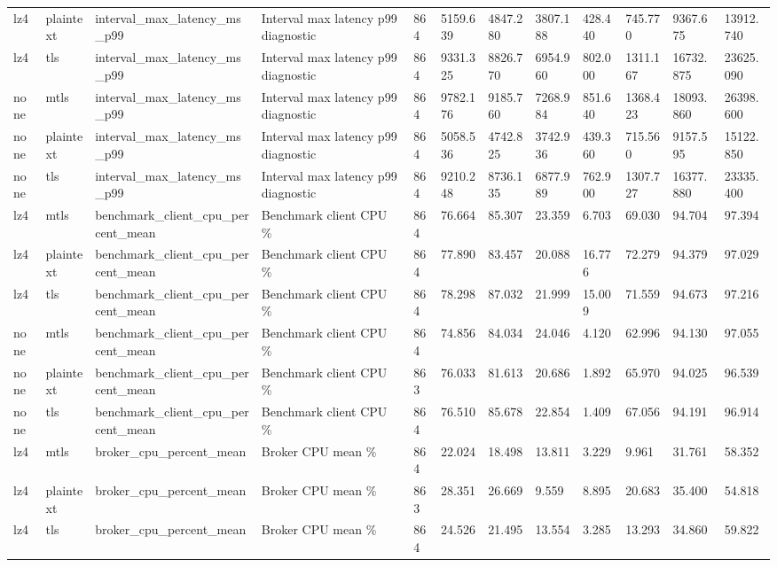 \begin{longtable}{llllllllllll}
lz4 & plaintext & interval\_max\_latency\_ms\_p99 & Interval max latency p99 diagnostic & 864 & 5159.639 & 4847.280 & 3807.188 & 428.440 & 745.770 & 9367.675 & 13912.740 \\
lz4 & tls & interval\_max\_latency\_ms\_p99 & Interval max latency p99 diagnostic & 864 & 9331.325 & 8826.770 & 6954.960 & 802.000 & 1311.167 & 16732.875 & 23625.090 \\
none & mtls & interval\_max\_latency\_ms\_p99 & Interval max latency p99 diagnostic & 864 & 9782.176 & 9185.760 & 7268.984 & 851.640 & 1368.423 & 18093.860 & 26398.600 \\
none & plaintext & interval\_max\_latency\_ms\_p99 & Interval max latency p99 diagnostic & 864 & 5058.536 & 4742.825 & 3742.936 & 439.360 & 715.560 & 9157.595 & 15122.850 \\
none & tls & interval\_max\_latency\_ms\_p99 & Interval max latency p99 diagnostic & 864 & 9210.248 & 8736.135 & 6877.989 & 762.900 & 1307.727 & 16377.880 & 23335.400 \\
lz4 & mtls & benchmark\_client\_cpu\_percent\_mean & Benchmark client CPU \% & 864 & 76.664 & 85.307 & 23.359 & 6.703 & 69.030 & 94.704 & 97.394 \\
lz4 & plaintext & benchmark\_client\_cpu\_percent\_mean & Benchmark client CPU \% & 864 & 77.890 & 83.457 & 20.088 & 16.776 & 72.279 & 94.379 & 97.029 \\
lz4 & tls & benchmark\_client\_cpu\_percent\_mean & Benchmark client CPU \% & 864 & 78.298 & 87.032 & 21.999 & 15.009 & 71.559 & 94.673 & 97.216 \\
none & mtls & benchmark\_client\_cpu\_percent\_mean & Benchmark client CPU \% & 864 & 74.856 & 84.034 & 24.046 & 4.120 & 62.996 & 94.130 & 97.055 \\
none & plaintext & benchmark\_client\_cpu\_percent\_mean & Benchmark client CPU \% & 863 & 76.033 & 81.613 & 20.686 & 1.892 & 65.970 & 94.025 & 96.539 \\
none & tls & benchmark\_client\_cpu\_percent\_mean & Benchmark client CPU \% & 864 & 76.510 & 85.678 & 22.854 & 1.409 & 67.056 & 94.191 & 96.914 \\
lz4 & mtls & broker\_cpu\_percent\_mean & Broker CPU mean \% & 864 & 22.024 & 18.498 & 13.811 & 3.229 & 9.961 & 31.761 & 58.352 \\
lz4 & plaintext & broker\_cpu\_percent\_mean & Broker CPU mean \% & 863 & 28.351 & 26.669 & 9.559 & 8.895 & 20.683 & 35.400 & 54.818 \\
lz4 & tls & broker\_cpu\_percent\_mean & Broker CPU mean \% & 864 & 24.526 & 21.495 & 13.554 & 3.285 & 13.293 & 34.860 & 59.822 \\

\end{longtable}
